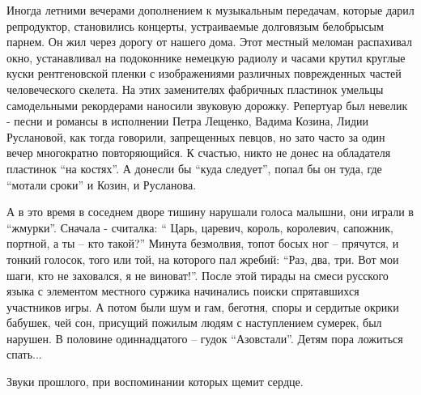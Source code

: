 Иногда летними вечерами дополнением к музыкальным передачам, которые дарил
репродуктор, становились концерты, устраиваемые долговязым белобрысым парнем.
Он жил через дорогу от нашего дома. Этот местный меломан распахивал окно,
устанавливал на подоконнике немецкую радиолу и часами крутил круглые куски
рентгеновской пленки с изображениями различных поврежденных частей
человеческого скелета. На этих заменителях фабричных пластинок умельцы
самодельными рекордерами наносили звуковую дорожку. Репертуар был невелик -
песни и романсы в исполнении Петра Лещенко, Вадима Козина, Лидии Руслановой,
как тогда говорили, запрещенных певцов, но зато часто за один вечер многократно
повторяющийся. К счастью, никто не донес на обладателя пластинок \enquote{на костях}. А
донесли бы \enquote{куда следует}, попал бы он туда, где \enquote{мотали сроки} и Козин, и
Русланова.

А в это время в соседнем дворе тишину нарушали голоса малышни, они играли в
\enquote{жмурки}. Сначала - считалка: \enquote{ Царь, царевич, король, королевич, сапожник,
портной, а ты – кто такой?} Минута безмолвия, топот босых ног – прячутся, и
тонкий голосок, того или той, на которого  пал жребий: \enquote{Раз, два, три. Вот мои
шаги, кто не заховался, я не виноват!}. После этой тирады на смеси русского
языка с элементом местного суржика начинались поиски спрятавшихся участников
игры. А потом были шум и гам, беготня, споры и сердитые окрики бабушек, чей
сон, присущий пожилым людям с наступлением сумерек, был нарушен. В половине
одиннадцатого – гудок \enquote{Азовстали}. Детям пора ложиться спать...

Звуки прошлого, при воспоминании которых щемит сердце.
